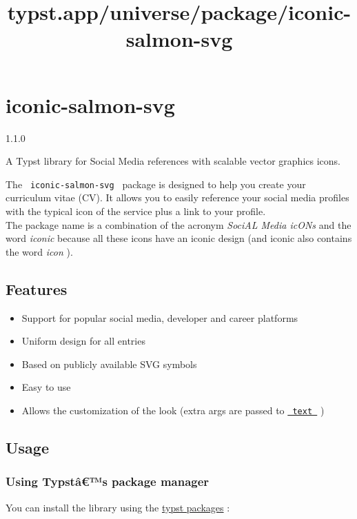 \title{typst.app/universe/package/iconic-salmon-svg}

\label{banner}
\section{iconic-salmon-svg}\label{iconic-salmon-svg}

{ 1.1.0 }

A Typst library for Social Media references with scalable vector
graphics icons.

\label{readme}
The \texttt{\ iconic-salmon-svg\ } package is designed to help you
create your curriculum vitae (CV). It allows you to easily reference
your social media profiles with the typical icon of the service plus a
link to your profile.\\
The package name is a combination of the acronym \emph{SociAL Media
icONs} and the word \emph{iconic} because all these icons have an iconic
design (and iconic also contains the word \emph{icon} ).

\subsection{Features}\label{features}

\begin{itemize}
\tightlist
\item
  Support for popular social media, developer and career platforms
\item
  Uniform design for all entries
\item
  Based on publicly available SVG symbols
\item
  Easy to use
\item
  Allows the customization of the look (extra args are passed to
  \href{https://typst.app/docs/reference/text/text/}{\texttt{\ text\ }}
  )
\end{itemize}

\subsection{Usage}\label{usage}

\subsubsection{Using Typstâ€™s package
manager}\label{using-typstuxe2s-package-manager}

You can install the library using the
\href{https://github.com/typst/packages}{typst packages} :

